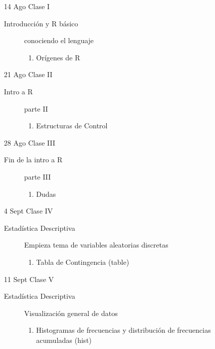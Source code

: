 \documentclass[letterpaper,12pt]{article}
\begin{document}
\begin{itemize} 

\item[14 Ago] Clase I
  \begin{description}
  \item[Introducción y R básico] conociendo el lenguaje
  \begin{enumerate}
  \item Orígenes de R
  \end{enumerate}
  \end{description}
  
  \item[21 Ago] Clase II
  \begin{description}
  \item[Intro a R] parte II
  \begin{enumerate}
  \item Estructuras de Control
  \end{enumerate}
  \end{description}
  
  \item[28 Ago] Clase III
  \begin{description}
  \item[Fin de la intro a R] parte III
  \begin{enumerate}
  \item Dudas
  \end{enumerate}
  \end{description}
  
  \item[4 Sept] Clase IV
  \begin{description}
  \item[Estadística Descriptiva] Empieza tema de variables aleatorias discretas
  \begin{enumerate}
  \item Tabla de Contingencia (table)
  \end{enumerate}
  \end{description}
  
  \item[11 Sept] Clase V
  \begin{description}
  \item[Estadística Descriptiva] Visualización general de datos
  \begin{enumerate}
  \item Histogramas de frecuencias y distribución de frecuencias acumuladas (hist)
  \end{enumerate}
  \end{description}
  

\end{itemize}
\end{document}
